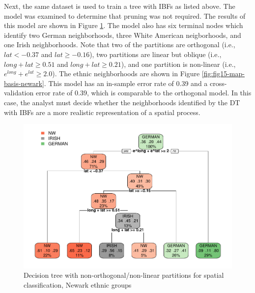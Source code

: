 \documentclass[]{elsarticle} %
\makeatletter
\def\maxwidth{\ifdim\Gin@nat@width>\linewidth\linewidth
\else\Gin@nat@width\fi}
\let\Oldincludegraphics\includegraphics
\renewcommand{\includegraphics}[1]{\Oldincludegraphics[width=\maxwidth]{#1}}
\makeatother
\begin{document}
Next, the same dataset is used to train a tree with IBFs as listed
above. The model was examined to determine that pruning was not
required. The results of this model are shown in Figure
\ref{fig:fig14-tree-basis-newark}. The model also has six terminal nodes
which identify two German neighborhoods, three White American
neigborhoods, and one Irish neighborhoods. Note that two of the
partitions are orthogonal (i.e., \(lat < -0.37\) and \(lat \ge -0.16\)),
two partitions are linear but oblique (i.e., \(long+lat \ge 0.51\) and
\(long+lat \ge 0.21\)), and one partition is non-linear (i.e.,
\(e^{long}+e^{lat} \ge 2.0\)). The ethnic neighborhoods are shown in
Figure \ref{fig:fig15-map-basis-newark}. This model has an in-sample
error rate of 0.39 and a cross-validation error rate of 0.39, which is
comparable to the orthogonal model. In this case, the analyst must
decide whether the neighborhoods identified by the DT with IBFs are a
more realistic representation of a spatial process.

\begin{figure}
\centering
\includegraphics{Trees_with_Base_Functions_v2_files/figure-latex/fig14-tree-basis-newark-1.pdf}
\caption{\label{fig:fig14-tree-basis-newark}Decision tree with
non-orthogonal/non-linear partitions for spatial classification, Newark
ethnic groups}
\end{figure}
\end{document}
